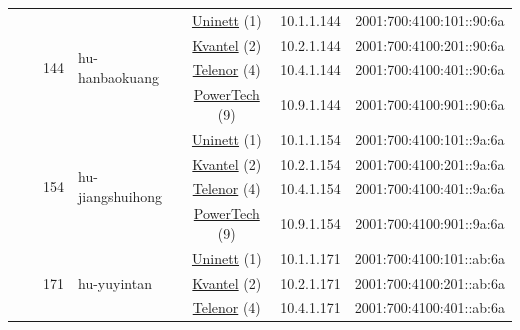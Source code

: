 \begin{small}
\begin{center}
\begin{longtable}{|c|c|c|c|c|c|c|c|}
  &  & \multirow{4}{*}{\tiny{144}} & \multicolumn{1}{|l|}{\multirow{4}{*}{\tiny{hu-hanbaokuang}}} & \multicolumn{2}{|c|}{\tiny{\href{https://www.uninett.no}{Uninett} (1)}} & \tiny{10.1.1.144} & \tiny{2001:700:4100:101::90:6a} \\* \cline{5-5}\cline{6-6}\cline{7-7}\cline{8-8}
  &  &  &  & \multicolumn{2}{|c|}{\tiny{\href{http://kvantel.no}{Kvantel} (2)}} & \tiny{10.2.1.144} & \tiny{2001:700:4100:201::90:6a} \\* \cline{5-5}\cline{6-6}\cline{7-7}\cline{8-8}
  &  &  &  & \multicolumn{2}{|c|}{\tiny{\href{https://www.telenor.no}{Telenor} (4)}} & \tiny{10.4.1.144} & \tiny{2001:700:4100:401::90:6a} \\* \cline{5-5}\cline{6-6}\cline{7-7}\cline{8-8}
  &  &  &  & \multicolumn{2}{|c|}{\tiny{\href{http://www.powertech.no}{PowerTech} (9)}} & \tiny{10.9.1.144} & \tiny{2001:700:4100:901::90:6a} \\* \cline{3-3}\cline{4-4}\cline{5-5}\cline{6-6}\cline{7-7}\cline{8-8}
  &  & \multirow{4}{*}{\tiny{154}} & \multicolumn{1}{|l|}{\multirow{4}{*}{\tiny{hu-jiangshuihong}}} & \multicolumn{2}{|c|}{\tiny{\href{https://www.uninett.no}{Uninett} (1)}} & \tiny{10.1.1.154} & \tiny{2001:700:4100:101::9a:6a} \\* \cline{5-5}\cline{6-6}\cline{7-7}\cline{8-8}
  &  &  &  & \multicolumn{2}{|c|}{\tiny{\href{http://kvantel.no}{Kvantel} (2)}} & \tiny{10.2.1.154} & \tiny{2001:700:4100:201::9a:6a} \\* \cline{5-5}\cline{6-6}\cline{7-7}\cline{8-8}
  &  &  &  & \multicolumn{2}{|c|}{\tiny{\href{https://www.telenor.no}{Telenor} (4)}} & \tiny{10.4.1.154} & \tiny{2001:700:4100:401::9a:6a} \\* \cline{5-5}\cline{6-6}\cline{7-7}\cline{8-8}
  &  &  &  & \multicolumn{2}{|c|}{\tiny{\href{http://www.powertech.no}{PowerTech} (9)}} & \tiny{10.9.1.154} & \tiny{2001:700:4100:901::9a:6a} \\* \cline{3-3}\cline{4-4}\cline{5-5}\cline{6-6}\cline{7-7}\cline{8-8}
  &  & \multirow{4}{*}{\tiny{171}} & \multicolumn{1}{|l|}{\multirow{4}{*}{\tiny{hu-yuyintan}}} & \multicolumn{2}{|c|}{\tiny{\href{https://www.uninett.no}{Uninett} (1)}} & \tiny{10.1.1.171} & \tiny{2001:700:4100:101::ab:6a} \\* \cline{5-5}\cline{6-6}\cline{7-7}\cline{8-8}
  &  &  &  & \multicolumn{2}{|c|}{\tiny{\href{http://kvantel.no}{Kvantel} (2)}} & \tiny{10.2.1.171} & \tiny{2001:700:4100:201::ab:6a} \\* \cline{5-5}\cline{6-6}\cline{7-7}\cline{8-8}
  &  &  &  & \multicolumn{2}{|c|}{\tiny{\href{https://www.telenor.no}{Telenor} (4)}} & \tiny{10.4.1.171} & \tiny{2001:700:4100:401::ab:6a} \\* \cline{5-5}\cline{6-6}\cline{7-7}\cline{8-8}

\end{longtable}
\end{center}
\end{small}
